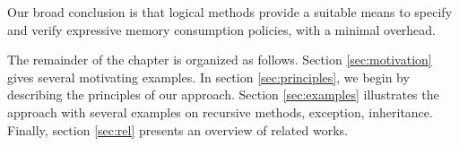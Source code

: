 Our broad conclusion is that logical methods provide a suitable means
to specify and verify expressive memory consumption policies, with a
minimal overhead.

The remainder of the chapter is organized as follows. 
Section \ref{sec:motivation} gives several motivating examples.
In section \ref{sec:principles},  we begin by describing the principles of our
approach. Section \ref{sec:examples} illustrates the approach with several examples on recursive methods, exception, inheritance.
Finally, section \ref{sec:rel} presents an overview of related works.
